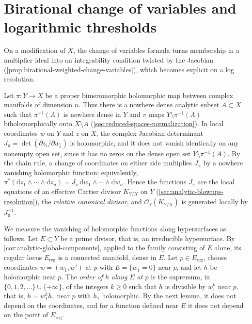 \section{Birational change of variables and logarithmic thresholds}
\label{sec:multiplier-birational-integrability}

On a modification of $X$, the change of variables formula turns membership in a multiplier ideal into an integrability condition twisted by the Jacobian (\cref{prop:birational-weighted-change-variables}), which becomes explicit on a log resolution.

Let $\pi\colon Y\to X$ be a proper bimeromorphic holomorphic map between complex manifolds of dimension $n$. Thus there is a nowhere dense analytic subset $A\subset X$ such that $\pi^{-1}(A)$ is nowhere dense in $Y$ and $\pi$ maps $Y\setminus\pi^{-1}(A)$ biholomorphically onto $X\setminus A$ (\cref{sec:reduced-spaces-normalization}). In local coordinates $w$ on $Y$ and $z$ on $X$, the complex Jacobian determinant $J_\pi=\det(\partial z_i/\partial w_j)$ is holomorphic, and it does not vanish identically on any nonempty open set, since it has no zeros on the dense open set $Y\setminus\pi^{-1}(A)$. By the chain rule, a change of coordinates on either side multiplies $J_\pi$ by a nowhere vanishing holomorphic function; equivalently, $\pi^*(\mathrm dz_1\wedge\cdots\wedge\mathrm dz_n)=J_\pi\,\mathrm dw_1\wedge\cdots\wedge\mathrm dw_n$. Hence the functions $J_\pi$ are the local equations of an effective Cartier divisor $K_{Y/X}$ on $Y$ (\cref{sec:analytic-blowups-resolution}), the \emph{relative canonical divisor}, and $\mathcal O_Y(K_{Y/X})$ is generated locally by $J_\pi^{-1}$.

We measure the vanishing of holomorphic functions along hypersurfaces as follows. Let $E\subset Y$ be a prime divisor, that is, an irreducible hypersurface. By \cref{cor:analytic-global-components}, applied to the family consisting of $E$ alone, its regular locus $E_{\mathrm{reg}}$ is a connected manifold, dense in $E$. Let $p\in E_{\mathrm{reg}}$, choose coordinates $w=(w_1,w')$ at $p$ with $E=\{w_1=0\}$ near $p$, and let $h$ be holomorphic near $p$. The \emph{order of $h$ along $E$ at $p$} is the supremum, in $\{0,1,2,\ldots\}\cup\{+\infty\}$, of the integers $k\geq0$ such that $h$ is divisible by $w_1^k$ near $p$, that is, $h=w_1^kh_1$ near $p$ with $h_1$ holomorphic. By the next lemma, it does not depend on the coordinates, and for a function defined near $E$ it does not depend on the point of $E_{\mathrm{reg}}$.

